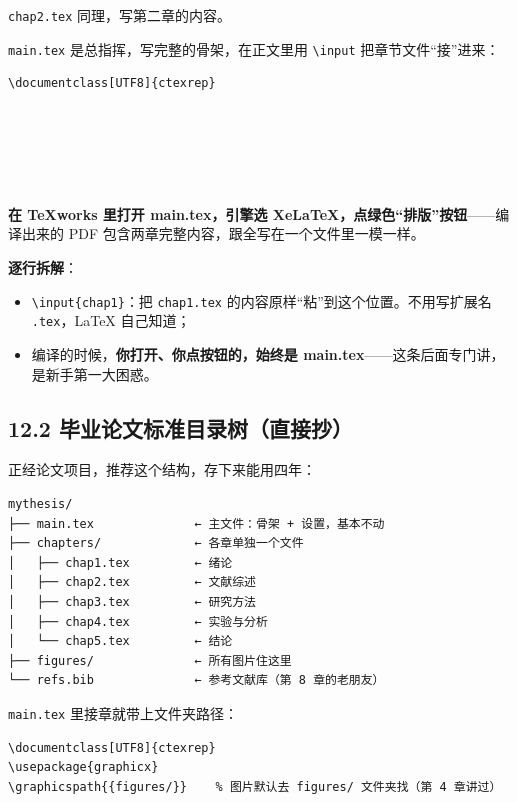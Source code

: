 \texttt{chap2.tex} 同理，写第二章的内容。

\texttt{main.tex} 是总指挥，写完整的骨架，在正文里用 \texttt{\textbackslash{}input} 把章节文件“接”进来：

\begin{lstlisting}
\documentclass[UTF8]{ctexrep}






\end{lstlisting}

\textbf{在 TeXworks 里打开 main.tex，引擎选 XeLaTeX，点绿色“排版”按钮}——编译出来的 PDF 包含两章完整内容，跟全写在一个文件里一模一样。

\textbf{逐行拆解}：

\begin{itemize}
\setlength{\itemsep}{2pt}
\item \texttt{\textbackslash{}input\{chap1\}}：把 \texttt{chap1.tex} 的内容原样“粘”到这个位置。不用写扩展名 \texttt{.tex}，LaTeX 自己知道；
\item 编译的时候，\textbf{你打开、你点按钮的，始终是 main.tex}——这条后面专门讲，是新手第一大困惑。
\end{itemize}

\subsection*{12.2 毕业论文标准目录树（直接抄）}

正经论文项目，推荐这个结构，存下来能用四年：

\begin{lstlisting}
mythesis/
├── main.tex              ← 主文件：骨架 + 设置，基本不动
├── chapters/             ← 各章单独一个文件
│   ├── chap1.tex         ← 绪论
│   ├── chap2.tex         ← 文献综述
│   ├── chap3.tex         ← 研究方法
│   ├── chap4.tex         ← 实验与分析
│   └── chap5.tex         ← 结论
├── figures/              ← 所有图片住这里
└── refs.bib              ← 参考文献库（第 8 章的老朋友）
\end{lstlisting}

\texttt{main.tex} 里接章就带上文件夹路径：

\begin{lstlisting}
\documentclass[UTF8]{ctexrep}
\usepackage{graphicx}
\graphicspath{{figures/}}    % 图片默认去 figures/ 文件夹找（第 4 章讲过）










\end{lstlisting}

